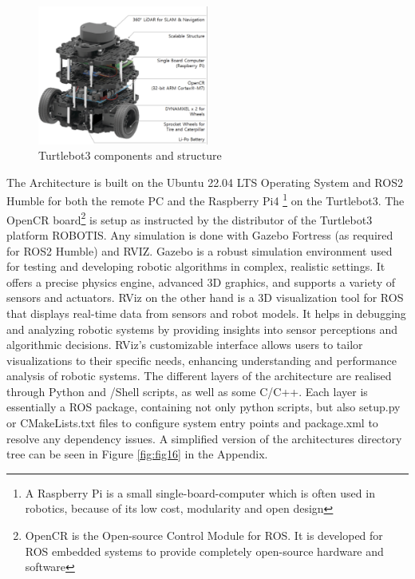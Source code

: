 \documentclass[%
paper=A4,               %
twoside=true,           %
openright,              %
11pt,                   %
bibliography=totoc,     %
titlepage=on,           %
DIV=12,                 %
BCOR=1.5cm,             %
parskip=half,            %
final
]{scrreprt}
\begin{document}
	\begin{figure}[ht]
		\centering
		\includegraphics[width=0.5\textwidth]{Graphics/Turtlebot3}
		\caption{Turtlebot3 components and structure}
		\label{fig: fig7}
	\end{figure}
		
	 The Architecture is built on the Ubuntu 22.04 LTS Operating System and ROS2 Humble for both the remote PC and the Raspberry Pi4 \footnote{ A Raspberry Pi is a small single-board-computer which is often used in robotics, because of its low cost, modularity and open design} on the Turtlebot3. The OpenCR board\footnote{ OpenCR is the Open-source Control Module for ROS. It is developed for ROS embedded systems to provide completely open-source hardware and software} is setup as instructed by the distributor of the Turtlebot3 platform ROBOTIS.\autocite{robotisEmanualROBOTIS2024} \newline
	 Any simulation is done with Gazebo Fortress (as required for ROS2 Humble) and RVIZ. 
	 Gazebo is a robust simulation environment used for testing and developing robotic algorithms in complex, realistic settings. It offers a precise physics engine, advanced 3D graphics, and supports a variety of sensors and actuators. RViz on the other hand is a 3D visualization tool for ROS that displays real-time data from sensors and robot models. It helps in debugging and analyzing robotic systems by providing insights into sensor perceptions and algorithmic decisions. RViz's customizable interface allows users to tailor visualizations to their specific needs, enhancing understanding and performance analysis of robotic systems. 
	 The different layers of the architecture are realised through Python and /Shell scripts, as well as some C/C++.  Each layer is essentially a ROS package, containing not only python scripts, but also setup.py or CMakeLists.txt files to configure system entry points and package.xml to resolve any dependency issues. A simplified version of the architectures directory tree can be seen in Figure \ref{fig:fig16} in the Appendix.
	 
\end{document}
